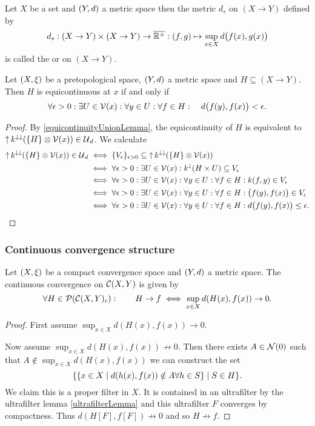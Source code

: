 \begin{definition}
Let $X$ be a set and $\sSet{Y,d}$ a metric space then the metric $d_s$ on $(X\to Y)$ defined by
\[ d_s: (X\to Y)\times (X\to Y) \to \overline{\mathbb{R}^+}: (f,g) \mapsto \sup_{x\in X}d\big(f(x), g(x)\big) \]
is called the  or  on $(X\to Y)$.
\end{definition}

\begin{proposition}
Let $\sSet{X,\xi}$ be a pretopological space, $\sSet{Y,d}$ a metric space and $H\subseteq (X\to Y)$. Then $H$ is equicontinuous at $x$ \textup{if and only if}
\[ \forall \epsilon >0: \exists U \in \operatorname{\mathcal{V}}(x): \forall y\in U: \forall f\in H: \quad d\big(f(y), f(x)\big) < \epsilon. \] 
\end{proposition}
\begin{proof}
By \ref{equicontinuityUnionLemma}, the equicontinuity of $H$ is equivalent to $\operatorname{\uparrow} k^{\downarrow\downarrow}(\{H\}\otimes \operatorname{\mathcal{V}}(x)) \in \operatorname{\mathcal{U}}_d$. We calculate
\begin{align*}
\operatorname{\uparrow} k^{\downarrow\downarrow}(\{H\}\otimes \operatorname{\mathcal{V}}(x)) \in \operatorname{\mathcal{U}}_d &\iff \{V_\epsilon\}_{\epsilon >0} \subseteq \operatorname{\uparrow} k^{\downarrow\downarrow}(\{H\}\otimes \operatorname{\mathcal{V}}(x)) \\
&\iff \forall \epsilon >0: \exists U\in \operatorname{\mathcal{V}}(x): k^{\downarrow}(H\times U) \subseteq V_\epsilon \\
&\iff \forall \epsilon >0: \exists U\in \operatorname{\mathcal{V}}(x): \forall y\in U: \forall f\in H: k(f, y) \in V_\epsilon \\
&\iff \forall \epsilon >0: \exists U\in \operatorname{\mathcal{V}}(x): \forall y\in U: \forall f\in H: \big(f(y), f(x)\big) \in V_\epsilon \\
&\iff \forall \epsilon >0: \exists U\in \operatorname{\mathcal{V}}(x): \forall y\in U: \forall f\in H: d\big(f(y), f(x)\big) \leq \epsilon.
\end{align*}
\end{proof}


\subsubsection{Continuous convergence structure}
\begin{proposition}
Let $\sSet{X,\xi}$ be a compact convergence space and $\sSet{Y,d}$ a metric space. The continuous convergence on $\operatorname{\mathcal{C}}(X,Y)$ is given by
\[ \forall H\in\operatorname{\mathcal{P}}(\operatorname{\mathcal{C}}(X,Y)_c): \qquad H\to f \iff \sup_{x\in X}d(H(x), f(x)) \to 0. \]
\end{proposition}
\begin{proof}
First assume $\sup_{x\in X}d(H(x), f(x)) \to 0$. 

Now assume $\sup_{x\in X}d(H(x), f(x)) \not\to 0$. Then there exists $A\in \operatorname{\mathcal{N}}(0)$ such that $A \notin \sup_{x\in X}d(H(x), f(x))$ we can construct the set
\[ \setbuilder{\setbuilder{x\in X}{d(h(x), f(x)) \notin A \forall h\in S}}{S\in H}. \]
We claim this is a proper filter in $X$. It is contained in an ultrafilter by the ultrafilter lemma \ref{ultrafilterLemma} and this ultrafilter $F$ converges by compactness. Thus $d(H[F], f[F]) \not\to 0$ and so $H\not\to f$.
\end{proof}



